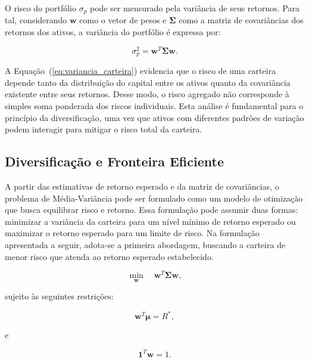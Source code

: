 O risco do portfólio $\sigma_p$ pode ser mensurado pela variância de seus retornos. Para tal, considerando $\mathbf{w}$ como o vetor de pesos e $\boldsymbol{\Sigma}$ como a matriz de covariâncias dos retornos dos ativos, a variância do portfólio é expressa por:

\begin{equation}
    \sigma_p^2 = \mathbf{w}^{T}\boldsymbol{\Sigma}\mathbf{w}.
    \label{eq:variancia_carteira}
\end{equation}

A Equação~(\ref{eq:variancia_carteira}) evidencia que o risco de uma carteira depende tanto da distribuição do capital entre os ativos quanto da covariância existente entre seus retornos. Desse modo, o risco agregado não corresponde à simples soma ponderada dos riscos individuais. Esta análise é fundamental para o princípio da diversificação, uma vez que ativos com diferentes padrões de variação podem interagir para mitigar o risco total da carteira.

\subsection{Diversificação e Fronteira Eficiente}
\label{subsec:diversificacao_fronteira}

A partir das estimativas de retorno esperado e da matriz de covariâncias, o problema de Média-Variância pode ser formulado como um modelo de otimização que busca equilibrar risco e retorno. Essa formulação pode assumir duas formas: minimizar a variância da carteira para um nível mínimo de retorno esperado ou maximizar o retorno esperado para um limite de risco. Na formulação apresentada a seguir, adota-se a primeira abordagem, buscando a carteira de menor risco que atenda ao retorno esperado estabelecido.

\begin{equation}
    \min_{\mathbf{w}} \quad \mathbf{w}^{T}\boldsymbol{\Sigma}\mathbf{w},
    \label{eq:markowitz_objetivo}
\end{equation}

sujeito às seguintes restrições:

\begin{equation}
    \mathbf{w}^{T}\boldsymbol{\mu} = R^{*},
    \label{eq:markowitz_retorno}
\end{equation}

e

\begin{equation}
    \mathbf{1}^{T}\mathbf{w} = 1.
    \label{eq:markowitz_soma_pesos}
\end{equation}

